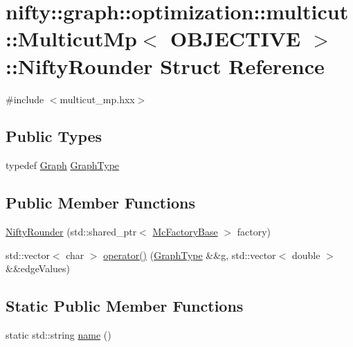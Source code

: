 \hypertarget{structnifty_1_1graph_1_1optimization_1_1multicut_1_1MulticutMp_1_1NiftyRounder}{}\section{nifty\+:\+:graph\+:\+:optimization\+:\+:multicut\+:\+:Multicut\+Mp$<$ O\+B\+J\+E\+C\+T\+I\+V\+E $>$\+:\+:Nifty\+Rounder Struct Reference}
\label{structnifty_1_1graph_1_1optimization_1_1multicut_1_1MulticutMp_1_1NiftyRounder}


{\ttfamily \#include $<$multicut\+\_\+mp.\+hxx$>$}

\subsection*{Public Types}
\begin{DoxyCompactItemize}
\item 
typedef \hyperlink{classnifty_1_1graph_1_1optimization_1_1multicut_1_1MulticutMp_ac12f279cc1b42960983637364ed3bbdc}{Graph} \hyperlink{structnifty_1_1graph_1_1optimization_1_1multicut_1_1MulticutMp_1_1NiftyRounder_a5a6a42c9abbb6608937e8e7cfb079e65}{Graph\+Type}
\end{DoxyCompactItemize}
\subsection*{Public Member Functions}
\begin{DoxyCompactItemize}
\item 
\hyperlink{structnifty_1_1graph_1_1optimization_1_1multicut_1_1MulticutMp_1_1NiftyRounder_a28dbcfccf5b74d0ab23957ecba92cf8d}{Nifty\+Rounder} (std\+::shared\+\_\+ptr$<$ \hyperlink{classnifty_1_1graph_1_1optimization_1_1multicut_1_1MulticutMp_a43262185c61afcc95eb125ac9d6d0305}{Mc\+Factory\+Base} $>$ factory)
\item 
std\+::vector$<$ char $>$ \hyperlink{structnifty_1_1graph_1_1optimization_1_1multicut_1_1MulticutMp_1_1NiftyRounder_ab64f6aca04d768ea8a2abda4196c655c}{operator()} (\hyperlink{structnifty_1_1graph_1_1optimization_1_1multicut_1_1MulticutMp_1_1NiftyRounder_a5a6a42c9abbb6608937e8e7cfb079e65}{Graph\+Type} \&\&g, std\+::vector$<$ double $>$ \&\&edge\+Values)
\end{DoxyCompactItemize}
\subsection*{Static Public Member Functions}
\begin{DoxyCompactItemize}
\item 
static std\+::string \hyperlink{structnifty_1_1graph_1_1optimization_1_1multicut_1_1MulticutMp_1_1NiftyRounder_a331c805d755be4526fd2b99b28d0e3b3}{name} ()
\end{DoxyCompactItemize}


